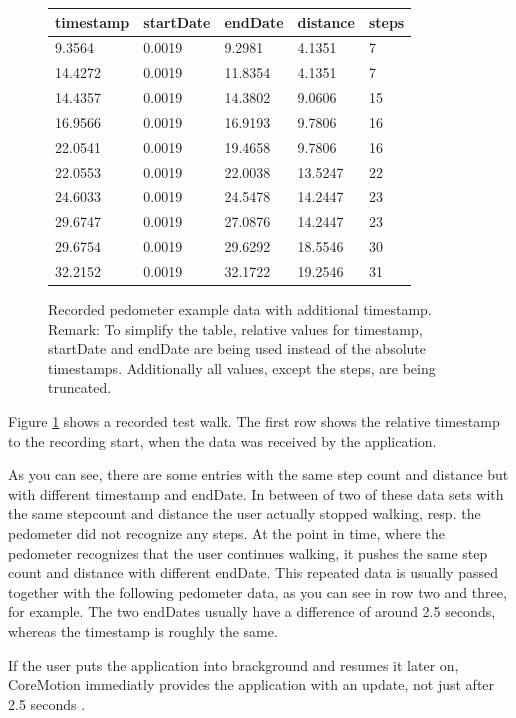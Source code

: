 \begin{center}
\begin{figure}
\begin{tabular}{*{5}{l}}
timestamp & startDate & endDate & distance & steps\\
\hline
9.3564 & 0.0019 & 9.2981 & 4.1351 & 7\\
14.4272 & 0.0019 & 11.8354 & 4.1351 & 7\\
14.4357 & 0.0019 & 14.3802 & 9.0606 & 15\\
16.9566 & 0.0019 & 16.9193 & 9.7806 & 16\\
22.0541 & 0.0019 & 19.4658 & 9.7806 & 16\\
22.0553 & 0.0019 & 22.0038 & 13.5247 & 22\\
24.6033 & 0.0019 & 24.5478 & 14.2447 & 23\\
29.6747 & 0.0019 & 27.0876 & 14.2447 & 23\\
29.6754 & 0.0019 & 29.6292 & 18.5546 & 30\\
32.2152 & 0.0019 & 32.1722 & 19.2546 & 31\\
\end{tabular}
\caption{Recorded pedometer example data with additional timestamp.
Remark: To simplify the table, relative values for timestamp, startDate and endDate are being used instead of the absolute timestamps.
Additionally all values, except the steps, are being truncated.}
\label{fig:pedometerExampleData}
\end{figure}
\end{center}

Figure \ref{fig:pedometerExampleData} shows a recorded test walk.
The first row shows the relative timestamp to the recording start, when the data was received by the application.

As you can see, there are some entries with the same step count and distance but with different timestamp and endDate.
In between of two of these data sets with the same stepcount and distance the user actually stopped walking, resp. the pedometer did not recognize any steps.
At the point in time, where the pedometer recognizes that the user continues walking, it pushes the same step count and distance with different endDate.
This repeated data is usually passed together with the following pedometer data, as you can see in row two and three, for example.
The two endDates usually have a difference of around 2.5 seconds, whereas the timestamp is roughly the same.

If the user puts the application into brackground and resumes it later on, CoreMotion immediatly provides the application with an update, not just after 2.5 seconds \cite{apple:wwdc_2014_pham}.


